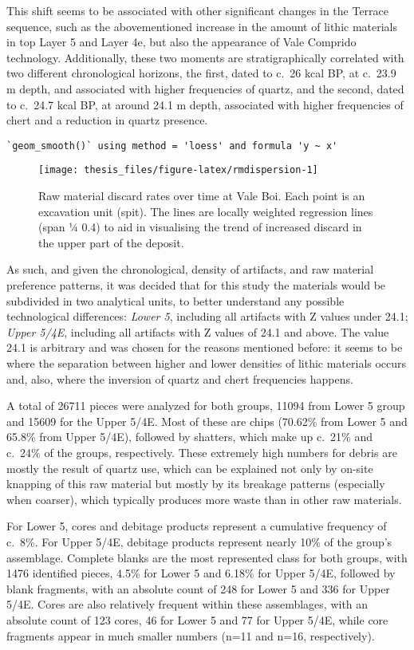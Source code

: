 \documentclass[12pt,twoside]{reedthesis}
\begin{document}
This shift seems to be associated with other significant changes in the Terrace sequence, such as the abovementioned increase in the amount of lithic materials in top Layer 5 and Layer 4e, but also the appearance of Vale Comprido technology. Additionally, these two moments are stratigraphically correlated with two different chronological horizons, the first, dated to c.~26 kcal BP, at c.~23.9 m depth, and associated with higher frequencies of quartz, and the second, dated to c.~24.7 kcal BP, at around 24.1 m depth, associated with higher frequencies of chert and a reduction in quartz presence.
\begin{verbatim}
`geom_smooth()` using method = 'loess' and formula 'y ~ x'
\end{verbatim}
\begin{figure}
\texttt{[image: thesis\_files/figure-latex/rmdispersion-1]} \caption{Raw material discard rates over time at Vale Boi. Each point is an excavation unit (spit). The lines are locally weighted regression lines (span ¼ 0.4) to aid in visualising the trend of increased discard in the upper part of the deposit.}\label{fig:rmdispersion}
\end{figure}
As such, and given the chronological, density of artifacts, and raw material preference patterns, it was decided that for this study the materials would be subdivided in two analytical units, to better understand any possible technological differences: \emph{Lower 5}, including all artifacts with Z values under 24.1; \emph{Upper 5/4E}, including all artifacts with Z values of 24.1 and above. The value 24.1 is arbitrary and was chosen for the reasons mentioned before: it seems to be where the separation between higher and lower densities of lithic materials occurs and, also, where the inversion of quartz and chert frequencies happens.

A total of 26711 pieces were analyzed for both groups, 11094 from Lower 5 group and 15609 for the Upper 5/4E. Most of these are chips (70.62\% from Lower 5 and 65.8\% from Upper 5/4E), followed by shatters, which make up c.~21\% and c.~24\% of the groups, respectively. These extremely high numbers for debris are mostly the result of quartz use, which can be explained not only by on-site knapping of this raw material but mostly by its breakage patterns (especially when coarser), which typically produces more waste than in other raw materials.

For Lower 5, cores and debitage products represent a cumulative frequency of c.~8\%. For Upper 5/4E, debitage products represent nearly 10\% of the group's assemblage. Complete blanks are the most represented class for both groups, with 1476 identified pieces, 4.5\% for Lower 5 and 6.18\% for Upper 5/4E, followed by blank fragments, with an absolute count of 248 for Lower 5 and 336 for Upper 5/4E. Cores are also relatively frequent within these assemblages, with an absolute count of 123 cores, 46 for Lower 5 and 77 for Upper 5/4E, while core fragments appear in much smaller numbers (n=11 and n=16, respectively).
\end{document}
